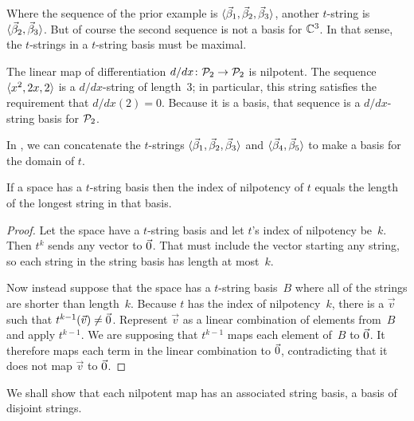 Where the sequence of the prior example is  
$\langle\vec{\beta}_1,
             \vec{\beta}_2,
             \vec{\beta}_3\rangle$,
another $t$-string is 
$\langle\vec{\beta}_2,
             \vec{\beta}_3\rangle$.
But of course the second sequence is not a basis for $\mathbb{C}^3$.
In that sense, the $t$-strings in a $t$-string basis must be maximal.

\begin{example}
The linear map of differentiation \( \mbox{$d/dx\colon \mathcal{P}_2\to \mathcal{P}_2$} \)
is nilpotent.
The sequence
\( \langle x^2, 2x, 2\rangle \)
is a \( d/dx \)-string of length~\( 3 \);
in particular, this string satisfies the requirement that $d/dx(2)=0$.
Because it is a basis, that sequence
is a \( d/dx \)-string basis for \( \mathcal{P}_2\).
\end{example}

\begin{example}
In , we can concatenate the $t$-strings
$\langle\vec{\beta}_1,\vec{\beta}_2,\vec{\beta}_3\rangle$ and
$\langle\vec{\beta}_4,\vec{\beta}_5\rangle$
to make a basis for the domain of $t$.
\end{example}

\begin{lemma}  \label{le:LongestTowerIsIndex}
If a space has a \( t \)-string basis then the index of nilpotency of $t$
equals the length of the longest string in that basis.
\end{lemma}

\begin{proof}
Let the space have a $t$-string basis and let $t$'s index of
nilpotency be~$k$.
Then \( t^k \) sends any vector to \( \vec{0} \). 
That must include 
the vector starting any string,
so each string in the string basis has length at most~$k$.

Now instead suppose that the space has a $t$-string basis~$B$ where 
all of the strings are shorter than length~\( k \).
Because $t$ has the index of nilpotency~$k$, there is a \( \vec{v} \) 
such that \( t^{k-1}(\vec{v})\neq\vec{0} \).
Represent $\vec{v}$ as a linear combination of elements from~$B$ 
and apply \( t^{k-1} \).
We are supposing that \( t^{k-1} \) maps each element of~$B$ to \( \vec{0} \).
It therefore maps each term in the linear combination to $\vec{0}$,
contradicting that it does not map \( \vec{v} \) to \( \vec{0} \).
\end{proof}

We shall show that each
nilpotent map has an associated string basis, a basis of disjoint strings.

